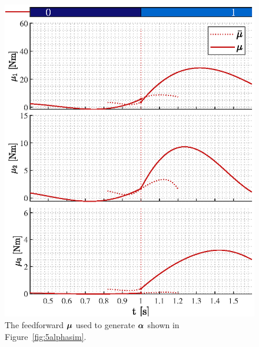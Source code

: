 \documentclass[../DC2019003Bouma.tex]{subfiles}
\begin{document}
\begin{figure}[bt!]
\begin{minipage}[c]{.48\textwidth}
\includegraphics[width=\textwidth]{mu.eps}
\end{minipage}
\caption{The feedforward $\boldsymbol{\mu}$ used to generate $\boldsymbol{\alpha}$ shown in Figure~\ref{fig:5alphasim}.}\label{fig:5musim}
\end{figure}
\end{document}
